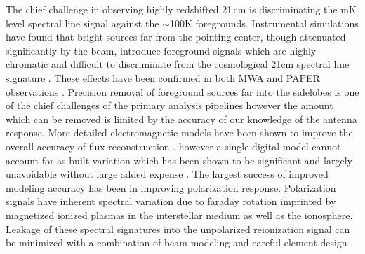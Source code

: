 \documentclass[preprint2,numberedappendix,tighten,twocolappendix]{aastex6}
\begin{document}
The chief challenge in observing highly redshifted 21\,cm is discriminating the mK level spectral line signal against the $\sim$100K foregrounds.  Instrumental simulations have found that bright sources far from the pointing center, though attenuated significantly by the beam, introduce foreground signals which are highly chromatic and difficult to discriminate from the cosmological 21cm spectral line signature \citep{Thyagarajan:2013p10039,2015ApJ...804...14T,Mort:2016SKAlowimagingarxiv}. These effects have been confirmed in both MWA and PAPER observations \citep{2015:ThyagarajanConfirmationwidefield,Pober:2016ApJ...819....8P}. Precision removal of foreground sources far into the sidelobes is one of the chief challenges of the primary analysis pipelines  \citep{2016:JacobsPipelinepaper} however the amount which can be removed is limited by the accuracy of our knowledge of the antenna response.  More detailed electromagnetic models have been shown to improve the overall accuracy of flux reconstruction \citep{Sutinjo:2015RaSc...50...52S}. however a single digital model cannot account for as-built variation which has been shown to be significant and largely unavoidable without large added expense \citep{2016:NebenBeamformingerrors}.  The largest success of improved modeling accuracy has been in improving polarization response. Polarization signals have inherent spectral variation due to faraday rotation imprinted by magnetized ionized plasmas in the interstellar medium as well as the ionosphere. Leakage of these spectral signatures into the unpolarized reionization signal can be minimized with a combination of beam modeling and careful element design \citep{Jelic:2010p8293,Moore:2013p9941,Asad:2015LofarPol}.
\end{document}
